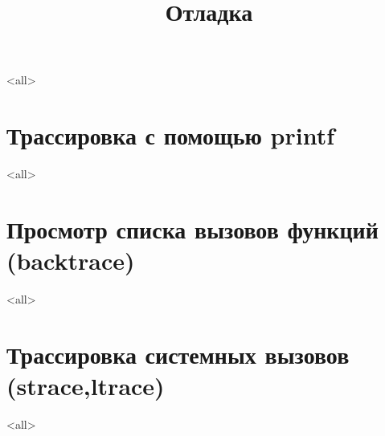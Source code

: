 

\title[Отладка]{Отладка}





\begin{frame}
	\frametitle{}
	\titlepage
	\vspace{-0.5cm}
	\begin{center}
	\end{center}
\end{frame}

\begin{frame}
	\tableofcontents
\end{frame}



\mode<all>{}

\section[printf]{Трассировка с помощью printf}

\mode<all>{}

\section[backtrace]{Просмотр списка вызовов функций (backtrace)}
\mode<all>{}

\section[strace]{Трассировка системных вызовов (strace,ltrace)}
\mode<all>{}



